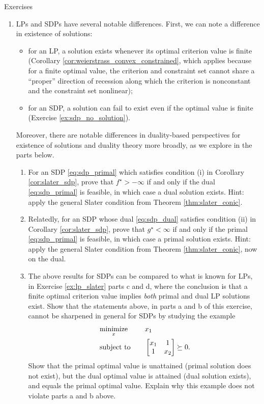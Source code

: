 \begin{xcb}{Exercises}
\begin{enumerate}[label=\thechapter.\arabic*]
\item \label{ex:lp_sdp_differences}
  LPs and SDPs have several notable differences. First, we can note a difference
  in existence of solutions:
  \begin{itemize}
  \item for an LP, a solution exists whenever its optimal criterion value is
    finite (Corollary \ref{cor:weierstrass_convex_constrained}, which applies
    because for a finite optimal value, the criterion and constraint set cannot
    share a ``proper'' direction of recession along which the criterion is
    nonconstant and the constraint set nonlinear);     
  \item for an SDP, a solution can fail to exist even if the optimal value is
    finite (Exercise \ref{ex:sdp_no_solution}).   
  \end{itemize}
  Moreover, there are notable differences in duality-based perspectives for
  existence of solutions and duality theory more broadly, as we explore in the
  parts below. 

\begin{enumerate}[label=\alph*.]
\item For an SDP \eqref{eq:sdp_primal} which satisfies condition (i) in
  Corollary \ref{cor:slater_sdp}, prove that $f^\star > -\infty$ if and only if
  the dual \eqref{eq:sdp_primal} is feasible, in which case a dual solution
  exists. Hint: apply the general Slater condition from Theorem
  \ref{thm:slater_conic}.    

\item Relatedly, for an SDP whose dual \eqref{eq:sdp_dual} satisfies condition
  (ii) in Corollary \ref{cor:slater_sdp}, prove that $g^\star < \infty$ if and
  only if the primal \eqref{eq:sdp_primal} is feasible, in which case a primal
  solution exists. Hint: apply the general Slater condition from Theorem
  \ref{thm:slater_conic}, now on the dual.  

\item The above results for SDPs can be compared to what is known for LPs, in
  Exercise \ref{ex:lp_slater} parts c and d, where the conclusion is that a
  finite optimal criterion value implies \emph{both} primal and dual LP 
  solutions exist. Show that the statements above, in parts a and b of this
  exercise, cannot be sharpened in general for SDPs by studying the example        
  \begin{alignat*}{2}
   &\operatorname*{minimize}_x \quad && x_1 \\
   &\operatorname{subject\,\,to} \quad && 
   \begin{bmatrix}
   x_1 & 1 \\
   1 & x_2 
 \end{bmatrix} \succeq 0.  
  \end{alignat*}
  Show that the primal optimal value is unattained (primal solution does not
  exist), but the dual optimal value is attained (dual solution exists), and
  equals the primal optimal value. Explain why this example does not violate
  parts a and b above. 


\end{enumerate}
\end{enumerate}
\end{xcb}
